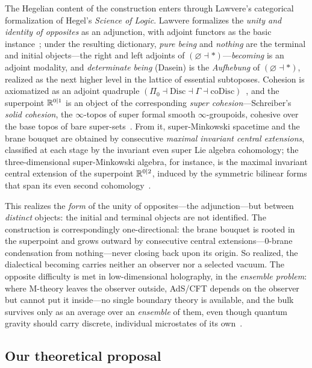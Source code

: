 The Hegelian content of the construction enters through Lawvere's categorical formalization of Hegel's \emph{Science of Logic}. Lawvere formalizes the \emph{unity and identity of opposites} as an adjunction, with adjoint functors as the basic instance~\cite{lawvere96unity}; under the resulting dictionary, \emph{pure being} and \emph{nothing} are the terminal and initial objects---the right and left adjoints of $(\varnothing \dashv \ast)$---\emph{becoming} is an adjoint modality, and \emph{determinate being} (Dasein) is the \emph{Aufhebung} of $(\varnothing \dashv \ast)$, realized as the next higher level in the lattice of essential subtoposes. Cohesion is axiomatized as an adjoint quadruple $(\Pi_0 \dashv \mathrm{Disc} \dashv \Gamma \dashv \mathrm{coDisc})$~\cite{Schreiber13cohesive}, and the superpoint $\mathbb{R}^{0|1}$ is an object of the corresponding \emph{super cohesion}---Schreiber's \emph{solid cohesion}, the $\infty$-topos of super formal smooth $\infty$-groupoids, cohesive over the base topos of bare super-sets~\cite{Schreiber13cohesive}. From it, super-Minkowski spacetime and the brane bouquet are obtained by consecutive \emph{maximal invariant central extensions}, classified at each stage by the invariant even super Lie algebra cohomology; the three-dimensional super-Minkowski algebra, for instance, is the maximal invariant central extension of the superpoint $\mathbb{R}^{0|2}$, induced by the symmetric bilinear forms that span its even second cohomology~\cite{huerta2018m}.

This realizes the \emph{form} of the unity of opposites---the adjunction---but between \emph{distinct} objects: the initial and terminal objects are not identified. The construction is correspondingly one-directional: the brane bouquet is rooted in the superpoint and grows outward by consecutive central extensions---$0$-brane condensation from nothing---never closing back upon its origin. So realized, the dialectical becoming carries neither an observer nor a selected vacuum. The opposite difficulty is met in low-dimensional holography, in the \emph{ensemble problem}: where M-theory leaves the observer outside, AdS/CFT depends on the observer but cannot put it inside---no single boundary theory is available, and the bulk survives only as an average over an \emph{ensemble} of them, even though quantum gravity should carry discrete, individual microstates of its own~\cite{Cooper2026}.

\subsection{Our theoretical proposal}\label{ssec:disc-proposal}

